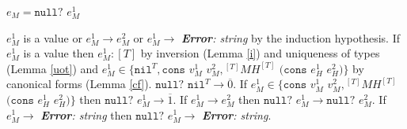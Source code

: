 \begin{case}

$e_{M}=\mathtt{null?}$ $e_{M}^{1}$

$e_{M}^{1}$ is a value or $e_{M}^{1}\rightarrow e_{M}^{2}$ or $e_{M}^{1}\rightarrow$ \emph{\textbf{Error}: string} by the induction hypothesis.  If $e_{M}^{1}$ is a value then $e_{M}^{1}:[T]$ by inversion (Lemma \ref{i}) and uniqueness of types (Lemma \ref{uot}) and $e_{M}^{1}\in\lbrace\mathtt{nil}^{T},\mathtt{cons}$ $v_{M}^{1}$ $v_{M}^{2},{^{[T]}M}H^{[T]}$ $(\mathtt{cons}$ $e_{H}^{1}$ $e_{H}^{2})\rbrace$ by canonical forms (Lemma \ref{cf}).  $\mathtt{null?}$ $\mathtt{nil}^{T}\rightarrow\overline{0}$.  If $e_{M}^{1}\in\lbrace\mathtt{cons}$ $v_{M}^{1}$ $v_{M}^{2},{^{[T]}M}H^{[T]}$ $(\mathtt{cons}$ $e_{H}^{1}$ $e_{H}^{2})\rbrace$ then $\mathtt{null?}$ $e_{M}^{1}\rightarrow\overline{1}$.  If $e_{M}^{1}\rightarrow e_{M}^{2}$ then $\mathtt{null?}$ $e_{M}^{1}\rightarrow\mathtt{null?}$ $e_{M}^{2}$.  If $e_{M}^{1}\rightarrow$ \emph{\textbf{Error}: string} then $\mathtt{null?}$ $e_{M}^{1}\rightarrow$ \emph{\textbf{Error}: string}.

\end{case}
